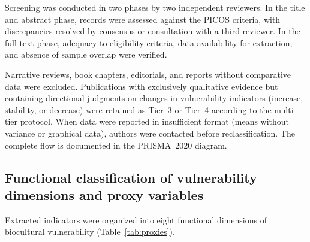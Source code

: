 \documentclass[12pt,a4paper]{article}
\begin{document}
Screening was conducted in two phases by two independent reviewers. In the title and abstract phase, records were assessed against the PICOS criteria, with discrepancies resolved by consensus or consultation with a third reviewer. In the full-text phase, adequacy to eligibility criteria, data availability for extraction, and absence of sample overlap were verified.

Narrative reviews, book chapters, editorials, and reports without comparative data were excluded. Publications with exclusively qualitative evidence but containing directional judgments on changes in vulnerability indicators (increase, stability, or decrease) were retained as Tier~3 or Tier~4 according to the multi-tier protocol. When data were reported in insufficient format (means without variance or graphical data), authors were contacted before reclassification. The complete flow is documented in the PRISMA~2020 diagram.

\subsection{Functional classification of vulnerability dimensions and proxy variables}
\label{sec:dimensions}

Extracted indicators were organized into eight functional dimensions of biocultural vulnerability (Table~\ref{tab:proxies}).
\end{document}
